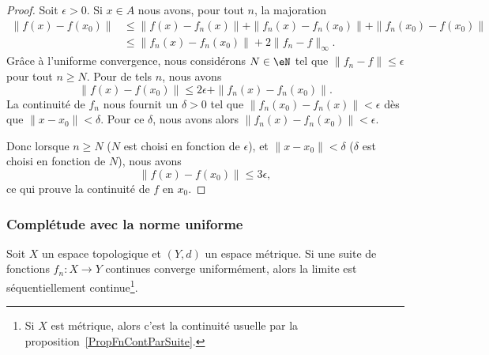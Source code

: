 \begin{proof}
	Soit \( \epsilon>0\). Si \( x\in A\) nous avons, pour tout \( n\), la majoration
	\begin{subequations}
		\begin{align}
			\| f(x)-f(x_0) \| & \leq \| f(x)-f_n(x) \|+\| f_n(x)-f_n(x_0) \|+\| f_n(x_0)-f(x_0) \| \\
			                  & \leq\| f_n(x)-f_n(x_0) \|+2\| f_n-f \|_{\infty}.
		\end{align}
	\end{subequations}
	Grâce à l'uniforme convergence, nous considérons \(N\in \eN\) tel que \( \| f_n-f \|\leq \epsilon\) pour tout \( n\geq N\). Pour de tels \( n\), nous avons
	\begin{equation}
		\| f(x)-f(x_0) \|\leq 2\epsilon+\| f_n(x)-f_n(x_0) \|.
	\end{equation}
	La continuité de \( f_n\) nous fournit un \( \delta>0\) tel que \( \| f_n(x_0)-f_n(x) \|<\epsilon\) dès que \( \| x-x_0 \|<\delta\). Pour ce \( \delta\), nous avons alors \( \| f_n(x)-f_n(x_0) \|<\epsilon\).

	Donc lorsque \( n\geq N\) (\( N\) est choisi en fonction de \( \epsilon\)), et \( \| x-x_0 \|<\delta\) (\( \delta\) est choisi en fonction de \( N\)), nous avons
	\begin{equation}
		\| f(x)-f(x_0) \|\leq 3\epsilon,
	\end{equation}
	ce qui prouve la continuité de \( f\) en \( x_0\).
\end{proof}

\subsubsection{Complétude avec la norme uniforme}

\begin{proposition}\label{PropCZslHBx}
	Soit \( X\) un espace topologique et \( (Y,d)\) un espace métrique. Si une suite de fonctions \( f_n\colon X\to Y\) continues converge uniformément, alors la limite est séquentiellement continue\footnote{Si \( X\) est métrique, alors c'est la continuité usuelle par la proposition~\ref{PropFnContParSuite}.}.
\end{proposition}

